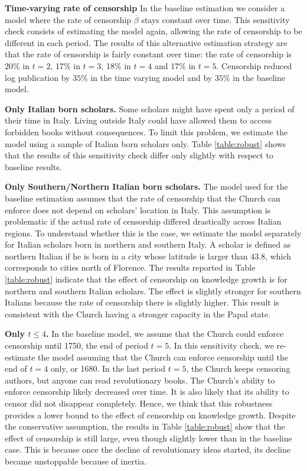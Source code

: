 \textbf{Time-varying rate of censorship} In the baseline estimation we consider a model where the rate of censorship $\overline{\beta}$ stays constant over time. This sensitivity check consists of estimating the model again, allowing the rate of censorship to be different in each period. The results of this alternative estimation strategy are that the rate of censorship is fairly constant over time: the rate of censorship is 20\% in $t=2$,  17\% in $t=3$, 18\% in $t=4$ and 17\% in $t=5$.  Censorship reduced log publication by $35\%$  in the time varying model and by $35\%$ in the baseline model.

\textbf{Only Italian born scholars.} Some scholars might have spent only a period of their time in Italy. Living outside Italy could have allowed them to access forbidden books without consequences. To limit this problem, we estimate the model using a sample of Italian born scholars only. Table \ref{table:robust} shows that the results of this sensitivity check differ only slightly with respect to baseline results.

\textbf{Only Southern/Northern Italian born scholars.} The model used for the baseline estimation assumes that the rate of censorship that the Church can enforce does not depend on scholars' location in Italy. This assumption is problematic if the actual rate of censorship differed drastically across Italian regions. To understand whether this is the case, we estimate the model separately for Italian scholars born in northern and southern Italy. A scholar is defined as northern Italian if he is born in a city whose latitude is larger than $43.8$, which corresponds to cities north of Florence. The results reported in Table \ref{table:robust} indicate that the effect of censorship on knowledge growth is  for northern and southern Italian scholars. The effect is slightly stronger for southern Italians because the rate of censorship there is slightly higher. This result is consistent with the Church having a stronger capacity in the Papal state.

\textbf{Only $t\leq4$.} In the baseline model, we assume that the Church could enforce censorship until 1750, the end of period $t=5$. In this sensitivity check, we re-estimate the model assuming that the Church can enforce censorship until the end of $t=4$ only, or 1680. In the last period $t=5$, the Church keeps censoring authors, but anyone can read revolutionary books. The Church's ability to enforce censorship likely decreased over time. It is also likely that its ability to censor did not disappear completely. Hence, we think that this robustness provides a lower bound to the effect of censorship on knowledge growth. Despite the conservative assumption, the results in Table \ref{table:robust} show that the effect of censorship is still large, even though slightly lower than in the baseline case. This is because once the decline of revolutionary ideas started, its decline became unstoppable because of inertia.


